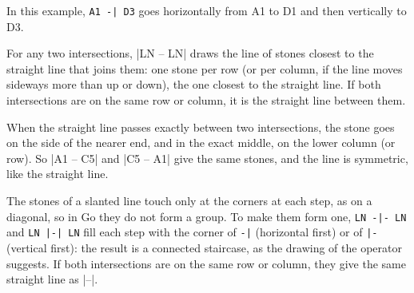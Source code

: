 \begin{codeexample}[width=6cm]
	\begin{goban}[label = {at = all}]
	\end{goban}
\end{codeexample}

In this example, \verb+A1 -| D3+ goes horizontally from A1 to D1 and then vertically to D3.


For any two intersections, |LN -- LN| draws the line of stones closest to the straight line that joins them: one stone per row (or per column, if the line moves sideways more than up or down), the one closest to the straight line. If both intersections are on the same row or column, it is the straight line between them.

\begin{codeexample}[width=6cm]
	\begin{goban}[label = {at = all}]
	\end{goban}
\end{codeexample}

When the straight line passes exactly between two intersections, the stone goes on the side of the nearer end, and in the exact middle, on the lower column (or row). So |A1 -- C5| and |C5 -- A1| give the same stones, and the line is symmetric, like the straight line.


The stones of a slanted line touch only at the corners at each step, as on a diagonal, so in Go they do not form a group. To make them form one, \verb+LN -|- LN+ and \verb+LN |-| LN+ fill each step with the corner of \verb+-|+ (horizontal first) or of \verb+|-+ (vertical first): the result is a connected staircase, as the drawing of the operator suggests. If both intersections are on the same row or column, they give the same straight line as |--|.

\begin{codeexample}[width=6cm]
	\begin{goban}[label = {at = all}]
	\end{goban}
\end{codeexample}

